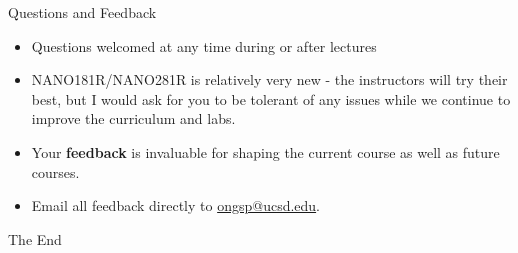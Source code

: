 \documentclass[aspectratio=169]{beamer}
\begin{document}
\begin{frame}{Questions and Feedback}
    \begin{itemize}
        \item Questions welcomed at any time during or after lectures
        \item NANO181R/NANO281R is relatively very new - the instructors will try their best, but I would ask for you to be tolerant of any issues while we continue to improve the curriculum and labs.
        \item Your \textbf{feedback} is invaluable for shaping the current course as well as future courses. 
        \item Email all feedback directly to \href{mailto:ongsp@ucsd.edu}{ongsp@ucsd.edu}.
    \end{itemize}
\end{frame}


\begin{frame}
    \Huge{\centerline{The End}}
\end{frame}
\end{document}
